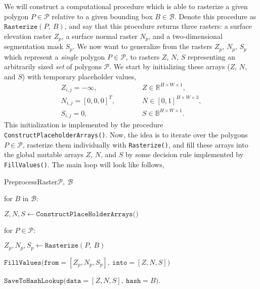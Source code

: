 We will construct a computational procedure which is able to rasterize a given polygon $P \in \mathcal{P}$ relative to a given bounding box $B \in \mathcal{B}$.
Denote this procedure as $\texttt{Rasterize}(P,~B)$, and say that this procedure returns three rasters: a surface elevation raster $Z_p$, a surface normal raster $N_p$, and a two-dimensional segmentation mask $S_p$.
We now want to generalize from the rasters $Z_p$, $N_p$, $S_p$ which represent a \textit{single} polygon $P \in \mathcal{P}$, to rasters $Z$, $N$, $S$ representing an arbitrarily sized \emph{set} of polygons $\mathcal{P}$.
We start by initializing these arrays ($Z$, $N$, and $S$) with temporary placeholder values,
\begin{align*}
  Z_{i,j} = -\infty, \hspace{3em} &Z \in \mathbb{R}^{H \times W \times 1}, \\
  N_{i,j} = {[0, 0, 0]}^T, \hspace{3em} &N \in [0, 1]^{H \times W \times 3}, \\
  S_{i,j} = 0, \hspace{3em} &S \in \mathbb{B}^{H \times W \times 1}.
\end{align*}
This initialization is implemented by the procedure \texttt{ConstructPlaceholderArrays()}.
Now, the idea is to iterate over the polygons $P \in \mathcal{P}$, rasterize them individually with \texttt{Rasterize()}, and fill these arrays into the global mutable arrays $Z$, $N$, and $S$ by some decision rule implemented by \texttt{FillValues()}.
The main loop will look like follows,
\begin{pseudofunc}{PreprocessRaster}{$\mathcal{P},~\mathcal{B}$}
  \item for $B$ in $\mathcal{B}$:
  \begin{pseudoloop}
    \item $Z, N, S \leftarrow \texttt{ConstructPlaceHolderArrays()}$
    \item for $P \in \mathcal{P}$:
    \begin{pseudoloop}
      \item $Z_p, N_p, S_p \leftarrow \texttt{Rasterize}(P,~B)$
      \item $\texttt{FillValues(from}=[Z_p, N_p, S_p],~\texttt{into}=[Z, N, S])$
    \end{pseudoloop}
    \item $\texttt{SaveToHashLookup(data}=[Z, N, S],~\texttt{hash}=B)$.
  \end{pseudoloop}
\end{pseudofunc}

